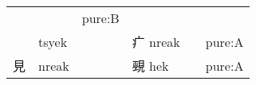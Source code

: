 \documentclass[14pt,a4paper]{scrartcl}
\begin{document}
\begin{longtable}[c]{@{}llllll@{}}
\begin{minipage}[t]{0.14\columnwidth}\raggedright\strut
\strut\end{minipage} &
\begin{minipage}[t]{0.14\columnwidth}\raggedright\strut
\strut\end{minipage} &
\begin{minipage}[t]{0.14\columnwidth}\raggedright\strut
pure:B
\strut\end{minipage}\tabularnewline
\begin{minipage}[t]{0.14\columnwidth}\raggedright\strut
𤕬
\strut\end{minipage} &
\begin{minipage}[t]{0.14\columnwidth}\raggedright\strut
tsyek
\strut\end{minipage} &
\begin{minipage}[t]{0.14\columnwidth}\raggedright\strut
\strut\end{minipage} &
\begin{minipage}[t]{0.14\columnwidth}\raggedright\strut
疒 nreak
\strut\end{minipage} &
\begin{minipage}[t]{0.14\columnwidth}\raggedright\strut
\strut\end{minipage} &
\begin{minipage}[t]{0.14\columnwidth}\raggedright\strut
pure:A
\strut\end{minipage}\tabularnewline
\begin{minipage}[t]{0.14\columnwidth}\raggedright\strut
見
\strut\end{minipage} &
\begin{minipage}[t]{0.14\columnwidth}\raggedright\strut
nreak
\strut\end{minipage} &
\begin{minipage}[t]{0.14\columnwidth}\raggedright\strut
\strut\end{minipage} &
\begin{minipage}[t]{0.14\columnwidth}\raggedright\strut
覡 hek
\strut\end{minipage} &
\begin{minipage}[t]{0.14\columnwidth}\raggedright\strut
\strut\end{minipage} &
\begin{minipage}[t]{0.14\columnwidth}\raggedright\strut
pure:A
\strut\end{minipage}\tabularnewline
\bottomrule
\end{longtable}
\end{document}
